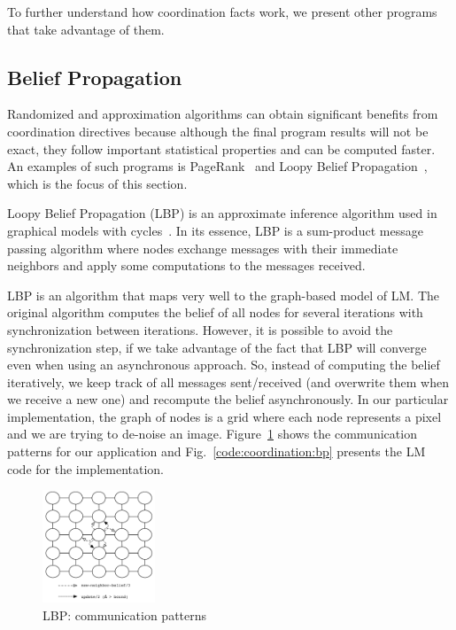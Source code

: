 To further understand how coordination facts work, we present other programs that
take advantage of them.

\subsection{Belief Propagation}

Randomized and approximation algorithms can obtain significant benefits from
coordination directives because although the final program results will not be
exact, they follow important statistical properties and can be computed faster.
An examples of such programs is PageRank~\cite{Lubachevsky:1986:CAA:4904.4801}
and Loopy Belief Propagation~\cite{Gonzalez+al:aistats09paraml}, which is the
focus of this section.

Loopy Belief Propagation (LBP) is an approximate inference algorithm used in
graphical models with cycles~\cite{Murphy99loopybelief}. In its essence, LBP is
a sum-product message passing algorithm where nodes exchange messages with their
immediate neighbors and apply some computations to the messages received.

LBP is an algorithm that maps very well to the graph-based model of LM. The
original algorithm computes the belief of all nodes for several iterations with
synchronization between iterations. However, it is possible to avoid the
synchronization step, if we take advantage of the fact that LBP will converge
even when using an asynchronous approach. So, instead of computing the belief
iteratively, we keep track of all messages sent/received (and overwrite them
when we receive a new one) and recompute the belief asynchronously. In our
particular implementation, the graph of nodes is a grid where each node
represents a pixel and we are trying to de-noise an image.
Figure~\ref{fig:coordination:bp} shows the communication patterns for our
application and Fig.~\ref{code:coordination:bp} presents the LM code for the
implementation.

\begin{figure}[h]
   \begin{center}
      \includegraphics[width=0.3\textwidth]{figures/bp/bp.pdf}
   \end{center}
\caption{LBP: communication patterns}
\label{fig:coordination:bp}
\end{figure}


